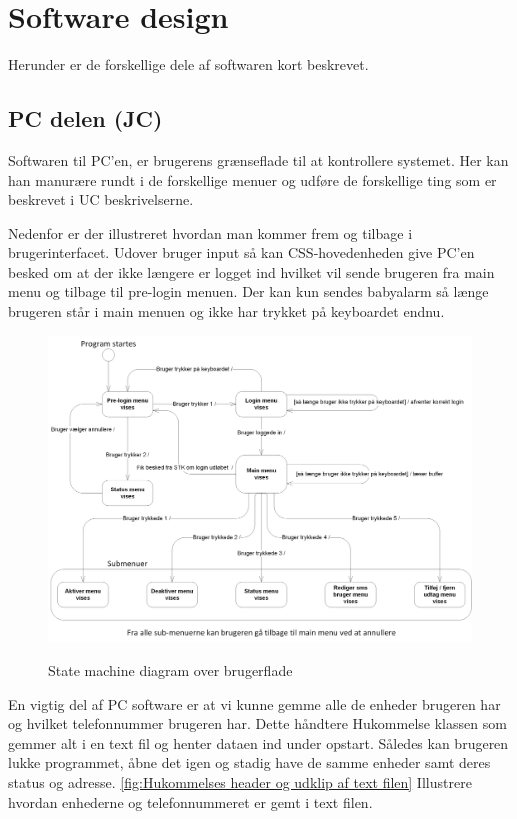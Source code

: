 \clearpage

\section{Software design}

Herunder er de forskellige dele af softwaren kort beskrevet. 

\subsection{PC delen (JC)}

Softwaren til PC'en, er brugerens grænseflade til at kontrollere systemet. Her kan han manurære rundt i de forskellige menuer og udføre de forskellige ting som er beskrevet i UC beskrivelserne.

Nedenfor er der illustreret hvordan man kommer frem og tilbage i brugerinterfacet. Udover bruger input så kan CSS-hovedenheden give PC'en besked om at der ikke længere er logget ind hvilket vil sende brugeren fra main menu og tilbage til pre-login menuen. Der kan kun sendes babyalarm så længe brugeren står i main menuen og ikke har trykket på keyboardet endnu.

\begin{figure}[htbp] \centering
{\includegraphics[width=\textwidth]{billeder/uml/state_machine_main}}
\caption{State machine diagram over brugerflade}
\label{fig:State machine diagram over brugerflade}
\end{figure}

En vigtig del af PC software er at vi kunne gemme alle de enheder brugeren har og hvilket telefonnummer brugeren har. Dette håndtere Hukommelse klassen som gemmer alt i en text fil og henter dataen ind under opstart. Således kan brugeren lukke programmet, åbne det igen og stadig have de samme enheder samt deres status og adresse. \ref{fig:Hukommelses header og udklip af text filen} Illustrere hvordan enhederne og telefonnummeret er gemt i text filen.

